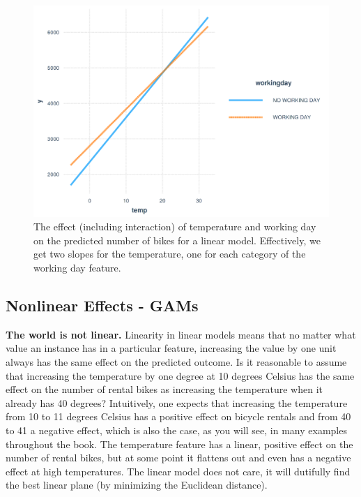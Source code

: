 \documentclass[12pt,]{krantz}
\begin{document}
\begin{figure}

{\centering \includegraphics[width=\textwidth]{images/interaction-plot-1} 

}

\caption{The effect (including interaction) of temperature and working day on the predicted number of bikes for a linear model. Effectively, we get two slopes for the temperature, one for each category of the working day feature.}\label{fig:interaction-plot}
\end{figure}

\hypertarget{gam}{\subsection{Nonlinear Effects - GAMs}\label{gam}}

\textbf{The world is not linear.} Linearity in linear models means that
no matter what value an instance has in a particular feature, increasing
the value by one unit always has the same effect on the predicted
outcome. Is it reasonable to assume that increasing the temperature by
one degree at 10 degrees Celsius has the same effect on the number of
rental bikes as increasing the temperature when it already has 40
degrees? Intuitively, one expects that increasing the temperature from
10 to 11 degrees Celsius has a positive effect on bicycle rentals and
from 40 to 41 a negative effect, which is also the case, as you will
see, in many examples throughout the book. The temperature feature has a
linear, positive effect on the number of rental bikes, but at some point
it flattens out and even has a negative effect at high temperatures. The
linear model does not care, it will dutifully find the best linear plane
(by minimizing the Euclidean distance).
\end{document}
